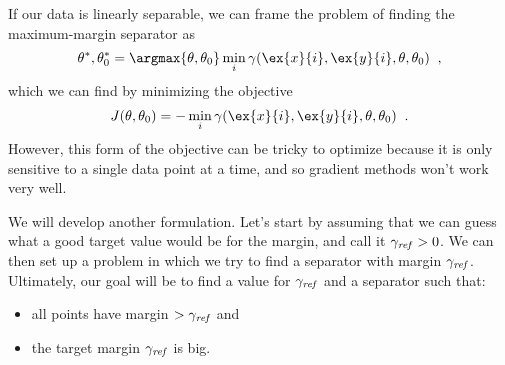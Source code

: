 If our data is linearly separable, we can frame the problem of finding
the maximum-margin separator as
\[
  \theta^*, \theta_0^* = \argmax{\theta,\theta_0} \min_i \gamma(\ex{x}{i},
  \ex{y}{i},\theta,\theta_0)\;\;,
\]
which we can find by minimizing the objective
\[
  J(\theta,\theta_0) = -\min_i \gamma(\ex{x}{i},\ex{y}{i},\theta,
  \theta_0)\;\;.
\]
However, this form of the objective can be tricky to optimize because
it is only sensitive to a single data point at a time, and so gradient
methods won't work very well.

We will develop another formulation.  Let's start by assuming
that we can guess what a good target value would be for the margin,
and call it $\gamma_{\it ref} > 0$. We can then set up a problem in
which we try to find a separator with margin $\gamma_{\it ref}$.
Ultimately, our goal will be to find a value for $\gamma_{\it ref}$
and a separator such that:
\begin{itemize}
  \item all points have margin $> \gamma_{\it ref}$ and
  \item the target margin $\gamma_{\it ref}$ is big.
\end{itemize}

